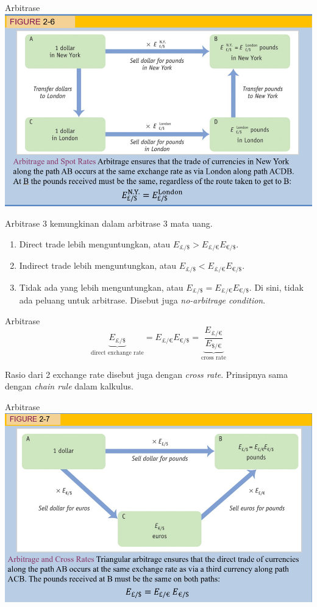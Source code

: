 \documentclass[
  ignorenonframetext,
]{beamer}
\providecommand{\tightlist}{%
  \setlength{\itemsep}{0pt}\setlength{\parskip}{0pt}}\usepackage{longtable,booktabs,array}
\begin{document}
\begin{frame}{Arbitrase}
\label{arbitrase}
\includegraphics{Picture6.png}
\end{frame}

\begin{frame}{Arbitrase}
\label{arbitrase-1}
3 kemungkinan dalam arbitrase 3 mata uang.

\begin{enumerate}
\tightlist
\item
  Direct trade lebih menguntungkan, atau \(E_{£/\$}>E_{£/€}E_{€/\$}\).
\item
  Indirect trade lebih menguntungkan, atau \(E_{£/\$}<E_{£/€}E_{€/\$}\).
\item
  Tidak ada yang lebih menguntungkan, atau \(E_{£/\$}=E_{£/€}E_{€/\$}\).
  Di sini, tidak ada peluang untuk arbitrase. Disebut juga
  \emph{no-arbitrage condition}.
\end{enumerate}
\end{frame}

\begin{frame}{Arbitrase}
\label{arbitrase-2}
\[
\underbrace{E_{£/\$}}_{\text{direct exchange rate}}=E_{£/€}E_{€/\$}=\underbrace{\frac{E_{£/€}}{E_{\$/€}}}_{\text{cross  rate}}
\]

Rasio dari 2 exchange rate disebut juga dengan \emph{cross rate}.
Prinsipnya sama dengan \emph{chain rule} dalam kalkulus.
\end{frame}

\begin{frame}{Arbitrase}
\label{arbitrase-3}
\includegraphics{Picture7.png}
\end{frame}
\end{document}
